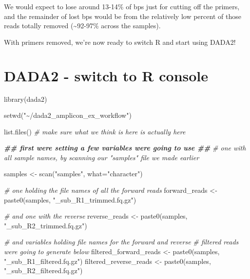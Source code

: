 \documentclass[
]{book}
\newenvironment{Shaded}{\begin{snugshade}}{\end{snugshade}}
\newcommand{\AttributeTok}[1]{\textcolor[rgb]{0.77,0.63,0.00}{#1}}
\newcommand{\CommentTok}[1]{\textcolor[rgb]{0.56,0.35,0.01}{\textit{#1}}}
\newcommand{\DocumentationTok}[1]{\textcolor[rgb]{0.56,0.35,0.01}{\textbf{\textit{#1}}}}
\newcommand{\FunctionTok}[1]{\textcolor[rgb]{0.00,0.00,0.00}{#1}}
\newcommand{\NormalTok}[1]{#1}
\newcommand{\OtherTok}[1]{\textcolor[rgb]{0.56,0.35,0.01}{#1}}
\newcommand{\StringTok}[1]{\textcolor[rgb]{0.31,0.60,0.02}{#1}}
\begin{document}
We would expect to lose around 13-14\% of bps just for cutting off the primers, and the remainder of lost bps would be from the relatively low percent of those reads totally removed (\textasciitilde92-97\% across the samples).

With primers removed, we're now ready to switch R and start using DADA2!

\hypertarget{dada2---switch-to-r-console}{%
\section{DADA2 - switch to R console}\label{dada2---switch-to-r-console}}

\begin{Shaded}
\begin{Highlighting}[]
    \FunctionTok{library}\NormalTok{(dada2)}

    \FunctionTok{setwd}\NormalTok{(}\StringTok{"\textasciitilde{}/dada2\_amplicon\_ex\_workflow"}\NormalTok{)}

    \FunctionTok{list.files}\NormalTok{() }\CommentTok{\# make sure what we think is here is actually here}

    \DocumentationTok{\#\# first we\textquotesingle{}re setting a few variables we\textquotesingle{}re going to use \#\#}
      \CommentTok{\# one with all sample names, by scanning our "samples" file we made earlier}
      
\NormalTok{    samples }\OtherTok{\textless{}{-}} \FunctionTok{scan}\NormalTok{(}\StringTok{"samples"}\NormalTok{, }\AttributeTok{what=}\StringTok{"character"}\NormalTok{)}

      \CommentTok{\# one holding the file names of all the forward reads}
\NormalTok{    forward\_reads }\OtherTok{\textless{}{-}} \FunctionTok{paste0}\NormalTok{(samples, }\StringTok{"\_sub\_R1\_trimmed.fq.gz"}\NormalTok{)}

      \CommentTok{\# and one with the reverse}
\NormalTok{    reverse\_reads }\OtherTok{\textless{}{-}} \FunctionTok{paste0}\NormalTok{(samples, }\StringTok{"\_sub\_R2\_trimmed.fq.gz"}\NormalTok{)}

      \CommentTok{\# and variables holding file names for the forward and reverse}
      \CommentTok{\# filtered reads we\textquotesingle{}re going to generate below}
\NormalTok{    filtered\_forward\_reads }\OtherTok{\textless{}{-}} \FunctionTok{paste0}\NormalTok{(samples, }\StringTok{"\_sub\_R1\_filtered.fq.gz"}\NormalTok{)}
\NormalTok{    filtered\_reverse\_reads }\OtherTok{\textless{}{-}} \FunctionTok{paste0}\NormalTok{(samples, }\StringTok{"\_sub\_R2\_filtered.fq.gz"}\NormalTok{)}
\end{Highlighting}
\end{Shaded}
\end{document}
